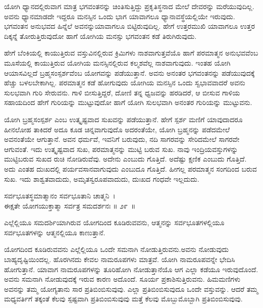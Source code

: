 ಯೋಗಿ ಧ್ಯಾನದಲ್ಲಿರುವಾಗ ಮಾತ್ರ ಭಗವಂತನನ್ನು ಚಿಂತಿಸುತ್ತಿದ್ದು ಪ್ರಕೃತಿಸ್ಥನಾದ ಮೇಲೆ ದೇವರನ್ನು ಮರೆಯುವುದಿಲ್ಲ. ಅವನು ಧ್ಯಾನಮಾಡದೇ ಇದ್ದರೂ ಮನಸ್ಸಿನ ಒಂದು ಭಾಗ ಯಾವಾಗಲೂ ಧ್ಯಾನಾವಸ್ಥೆಯಲ್ಲಿಯೇ ಇರುವುದು. ಭಗವಂತನ ಅನುಭವದ ಹಿನ್ನೆಲೆ ಅವನನ್ನು\break ಯಾವಾಗಲೂ ಬಿಟ್ಟಿರುವುದಿಲ್ಲ. ಹೇಗೆ ಉತ್ತರಮುಖಿ ಯಾವಾಗಲೂ ಉತ್ತರ ದಿಕ್ಕನ್ನೆ ತೋರುತ್ತಿರು\-ವುದೋ ಹಾಗೆ ಯೋಗಿಯ ಮನಸ್ಸು ಭಗವಂತನ ಕಡೆ ತಿರುಗಿರುವುದು.

ಹೇಗೆ ಬೆಂಕಿಯಲ್ಲಿ ಕಾಯುತ್ತಿರುವ ವಸ್ತುವಿನಲ್ಲಿರುವ ಕ್ರಿಮಿಗಳು ನಾಶವಾಗುತ್ತವೆಯೊ ಹಾಗೆ ಪರಮಾತ್ಮನ ಅನುಭವವೆಂಬ ಮೂಸೆಯಲ್ಲಿ ಕಾಯುತ್ತಿರುವ ಯೋಗಿಯ ಮನಸ್ಸಿನಲ್ಲಿರುವ ಕಲ್ಮಶ\-ವೆಲ್ಲ ನಾಶವಾಗುವುದು. ಇಂತಹ ಯೋಗಿ ಆಯಾಸವಿಲ್ಲದೆ ಬ್ರಹ್ಮಸಂಸ್ಪರ್ಶವೆಂಬ ಯೋಗವನ್ನು ಪಡೆಯುತ್ತಾನೆ. ಅವನು ಅನಂತರ ಭಗವಂತನನ್ನು ಪಡೆಯುವುದಕ್ಕೆ ಹೆಚ್ಚು ಬಳಲಬೇಕಾಗಿಲ್ಲ. ಪರಮಾತ್ಮನ ಕಡೆ ಹೋಗುವುದು ಯೋಗಿಯ ಮನಸ್ಸಿನ ಒಂದು ಸ್ವಭಾವವಾದರೆ ಅವನು ಸುಲಭವಾಗಿ ಗುರಿ ಸೇರುವನು. ಗಾಳಿ ಬೀಸುತ್ತಿದ್ದರೆ, ದೋಣಿ ತನ್ನ ಧ್ವಜವನ್ನು ಹರಡಿದರೆ, ಆ ಬೀಸುವ ಗಾಳಿಯ ಸಹಾಯದಿಂದ ಹೇಗೆ ಗುರಿಯನ್ನು ಮುಟ್ಟುವುದೋ ಹಾಗೆ ಯೋಗಿ ಸುಲಭವಾಗಿ ಅನಂತರ ಗುರಿಯನ್ನು ಮುಟ್ಟುವನು.

ಯೋಗಿ ಬ್ರಹ್ಮಸಂಸ್ಪರ್ಶ ಎಂಬ ಉತ್ಕೃಷ್ಟವಾದ ಸುಖವನ್ನು ಪಡೆಯುತ್ತಾನೆ. ಹೇಗೆ ಸ್ಪರ್ಶ ಮಣಿಗೆ ಯಾವುದಾದರೂ ಹೀನಲೋಹ ತಾಕಿದರೆ ಅದೂ ಕೂಡ ಚಿನ್ನವಾಗುವುದೊ ಅದರಂತೆಯೇ, ಯೋಗಿ ಬ್ರಹ್ಮನನ್ನು ಪಡೆದಮೇಲೆ ಅವನಂತೆಯೇ ಆಗುತ್ತಾನೆ. ಅವನ ಧರ್ಮವೆ, ಇವನಿಗೆ ಬರುವುದು, ನದಿ ಸಾಗರವನ್ನು ಸೇರಿದಮೇಲೆ ಸಾಗರವೇ ಆಗುವಂತೆ. ಇದು ಉತ್ಕೃಷ್ಟವಾದ ಸುಖ, ಪರಮಾತ್ಮನನ್ನು ಮುಟ್ಟಿ ಬರುವ ಸುಖ. ನಾವು ಇಂದ್ರಿಯವಸ್ತುಗಳನ್ನು ಮುಟ್ಟಿಬರುವ ಸುಖದ ರುಚಿ ನೋಡಿರುವೆವು. ಅದೇನು ಎಂಬುದು ಗೊತ್ತಿದೆ. ಅದೆಷ್ಟು ಕ್ಷಣಿಕ ಎಂಬುದು ಗೊತ್ತಿದೆ. ಅದು ಎಂತಹ ದುಃಖದಲ್ಲಿ ಪರ್ಯವಸಾನವಾಗುವುದು ಎಂಬುದೂ ಗೊತ್ತಿದೆ. ಹೀಗಲ್ಲ ಪರಮಾತ್ಮನ ಸಂಗದಿಂದ ಬರುವ ಸುಖ. ಇದು ಶಾಶ್ವತವಾದುದು, ಅಮೃತಸ್ವರೂಪವಾದುದು, ದುಃಖದ ಗಂಧವೇ ಇಲ್ಲದುದು.

\begin{shloka}
ಸರ್ವಭೂತಸ್ಥಮಾತ್ಮಾನಂ ಸರ್ವಭೂತಾನಿ ಚಾತ್ಮನಿ~।\\ಈಕ್ಷತೇ ಯೋಗಯುಕ್ತಾತ್ಮಾ ಸರ್ವತ್ರ ಸಮದರ್ಶನಃ \hfill॥ ೨೯~॥
\end{shloka}

\begin{artha}
ಎಲ್ಲೆಲ್ಲಿಯೂ ಸಮದರ್ಶಿಯಾಗಿರುವ ಯೋಗದಿಂದ ಕೂಡಿರುವವನು, ಆತ್ಮನನ್ನು ಸರ್ವಭೂತ\-ಗಳಲ್ಲಿಯೂ ಸರ್ವಭೂತಗಳನ್ನು ಆತ್ಮನಲ್ಲಿಯೂ ಕಾಣುತ್ತಾನೆ.
\end{artha}

ಯೋಗದಿಂದ ಕೂಡಿರುವವನು ಎಲ್ಲೆಲ್ಲಿಯೂ ಒಂದೇ ಸಮನಾಗಿ ನೋಡುತ್ತಿರುವನು.\break ಅವನು ನೋಡುವುದು ಬಾಹ್ಯದೃಷ್ಟಿಯಿಂದಲ್ಲ. ಹೊರಗಿನದು ಕೇವಲ ನಾಮರೂಪಗಳು ಮಾತ್ರವೆ. ಯೋಗಿ ನಾಮರೂಪವನ್ನೇ ಭೇದಿಸಿ ಹೋಗುತ್ತಾನೆ. ಯಾವಾಗ ನಾಮರೂಪಗಳನ್ನು ತೂರಿಹೋಗಿ ನೋಡುತ್ತಾನೆಯೊ ಆಗ ಎಲ್ಲಾ ಕಡೆಯೂ ಇರುವುದೊಂದೆ. ಅವನು ಸಮನಾಗಿ ನೋಡುವುದಕ್ಕೆ ಇರುವ ಕಾರಣ ಅದೊಂದೆ. ಸೂರ್ಯ ಪ್ರಕಾಶಿಸುತ್ತಿರುವನು. ಹಿಮಮಣಿಗಳು ಅವನನ್ನು ತಮ್ಮ ಯೋಗ್ಯತಾನು ಸಾರ ಪ್ರತಿಬಿಂಬಿಸುವುವು. ಎಲ್ಲಾ ಪ್ರತಿಬಿಂಬಿಸುವುದೂ ಒಂದೇ ವಸ್ತುವನ್ನು. ಆದರೆ ತಮ್ಮ ಮಧ್ಯವರ್ತಿಗೆ ತಕ್ಕಂತೆ ಕೆಲವು ಸ್ಪಷ್ಟವಾಗಿ ಪ್ರತಿಬಿಂಬಿಸುವುವು ಮತ್ತೆ ಕೆಲವು ಮೊಬ್ಬುಮೊಬ್ಬಾಗಿ ಪ್ರತಿಬಿಂಬಿಸುವುವು.

